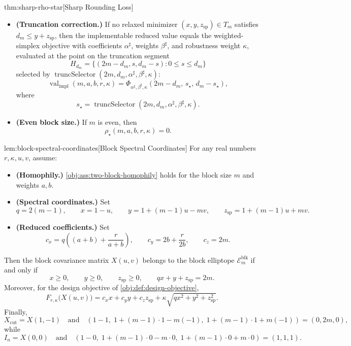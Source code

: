 \begin{theoremv}{thm:sharp-rho-star}[Sharp Rounding Loss]
\begin{itemize}
\item \textbf{(Truncation correction.)}
If no relaxed minimizer $(x,y,z_{\mathrm{sp}})\in T_m$ satisfies $d_m\le y+z_{\mathrm{sp}}$, then the implementable reduced value equals the weighted-simplex objective with coefficients $\alpha^\sharp$, weights $\beta^\sharp$, and robustness weight $\kappa$, evaluated at the point on the truncation segment
\[
H_{d_m}=\{(2m-d_m,s,d_m-s):0\le s\le d_m\}
\]
selected by $\operatorname{truncSelector}(2m,d_m,\alpha^\sharp,\beta^\sharp,\kappa)$:
\[
\operatorname{val}_{\mathrm{impl}}(m,a,b,r,\kappa)
=
\Phi_{\alpha^\sharp,\beta^\sharp,\kappa}
\!\left(
2m-d_m,\,
s_\star,\,
d_m-s_\star
\right),
\]
where
\[
s_\star=\operatorname{truncSelector}(2m,d_m,\alpha^\sharp,\beta^\sharp,\kappa).
\]

\item \textbf{(Even block size.)}
If $m$ is even, then
\[
\rho_\star(m,a,b,r,\kappa)=0.
\]
\end{itemize}
\end{theoremv}

\begin{lemmav}{lem:block-spectral-coordinates}[Block Spectral Coordinates]
For any real numbers $r,\kappa,u,v$, assume:
\begin{itemize}
\item \textbf{(Homophily.)} \cref{obj:ass:two-block-homophily} holds for the block size $m$ and weights $a,b$.
\item \textbf{(Spectral coordinates.)} Set
\[
q=2(m-1),\qquad
x=1-u,\qquad
y=1+(m-1)u-mv,\qquad
z_{\mathrm{sp}}=1+(m-1)u+mv .
\]
\item \textbf{(Reduced coefficients.)} Set
\[
c_x=q\left((a+b)+\frac{r}{a+b}\right),\qquad
c_y=2b+\frac{r}{2b},\qquad
c_z=2m .
\]
\end{itemize}
Then the block covariance matrix $X(u,v)$ belongs to the block elliptope $\mathcal E_m^{\mathrm{blk}}$ if and only if
\[
x\ge 0,\qquad y\ge 0,\qquad z_{\mathrm{sp}}\ge 0,\qquad
qx+y+z_{\mathrm{sp}}=2m .
\]
Moreover, for the design objective of \cref{obj:def:design-objective},
\[
F_{r,\kappa}\bigl(X(u,v)\bigr)
=
c_xx+c_yy+c_zz_{\mathrm{sp}}
+\kappa\sqrt{qx^2+y^2+z_{\mathrm{sp}}^2}.
\]
Finally,
\[
X_{\mathrm{cut}}=X(1,-1)
\quad\text{and}\quad
(1-1,\;1+(m-1)\cdot 1-m(-1),\;1+(m-1)\cdot 1+m(-1))
=(0,2m,0),
\]
while
\[
I_n=X(0,0)
\quad\text{and}\quad
(1-0,\;1+(m-1)\cdot 0-m\cdot 0,\;1+(m-1)\cdot 0+m\cdot 0)
=(1,1,1).
\]
\end{lemmav}

